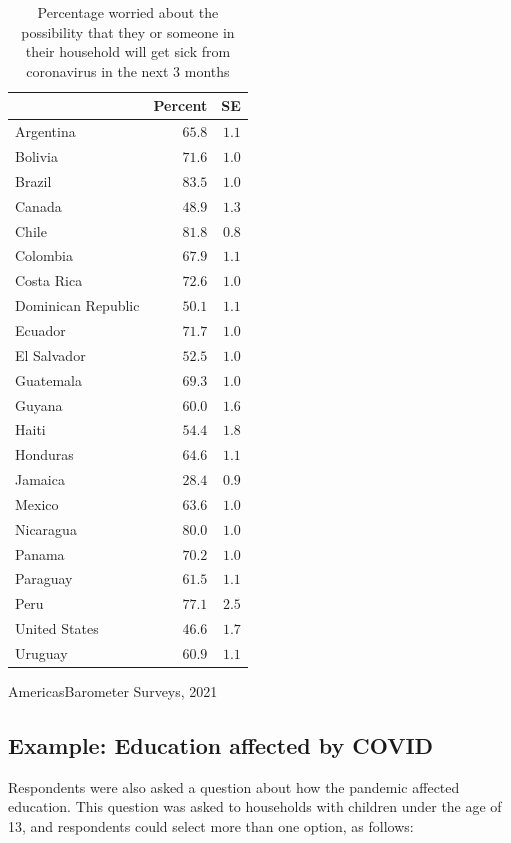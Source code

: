 \documentclass[
]{krantz}
\begin{document}
\setlength{\LTpost}{0mm}
\begin{longtable}{l|rr}
\caption{\label{tab:ambarom-worry-tab}Percentage worried about the possibility that they or someone in their household will get sick from coronavirus in the next 3 months}\\
\toprule
\multicolumn{1}{l}{} & Percent & SE \\ 
\midrule
Argentina & $65.8$ & $1.1$ \\ 
Bolivia & $71.6$ & $1.0$ \\ 
Brazil & $83.5$ & $1.0$ \\ 
Canada & $48.9$ & $1.3$ \\ 
Chile & $81.8$ & $0.8$ \\ 
Colombia & $67.9$ & $1.1$ \\ 
Costa Rica & $72.6$ & $1.0$ \\ 
Dominican Republic & $50.1$ & $1.1$ \\ 
Ecuador & $71.7$ & $1.0$ \\ 
El Salvador & $52.5$ & $1.0$ \\ 
Guatemala & $69.3$ & $1.0$ \\ 
Guyana & $60.0$ & $1.6$ \\ 
Haiti & $54.4$ & $1.8$ \\ 
Honduras & $64.6$ & $1.1$ \\ 
Jamaica & $28.4$ & $0.9$ \\ 
Mexico & $63.6$ & $1.0$ \\ 
Nicaragua & $80.0$ & $1.0$ \\ 
Panama & $70.2$ & $1.0$ \\ 
Paraguay & $61.5$ & $1.1$ \\ 
Peru & $77.1$ & $2.5$ \\ 
United States & $46.6$ & $1.7$ \\ 
Uruguay & $60.9$ & $1.1$ \\ 
\bottomrule
\end{longtable}
\begin{minipage}{\linewidth}
AmericasBarometer Surveys, 2021\\
\end{minipage}

\hypertarget{example-education-affected-by-covid}{%
\subsection{Example: Education affected by COVID}\label{example-education-affected-by-covid}}

Respondents were also asked a question about how the pandemic affected education. This question was asked to households with children under the age of 13, and respondents could select more than one option, as follows:
\end{document}

